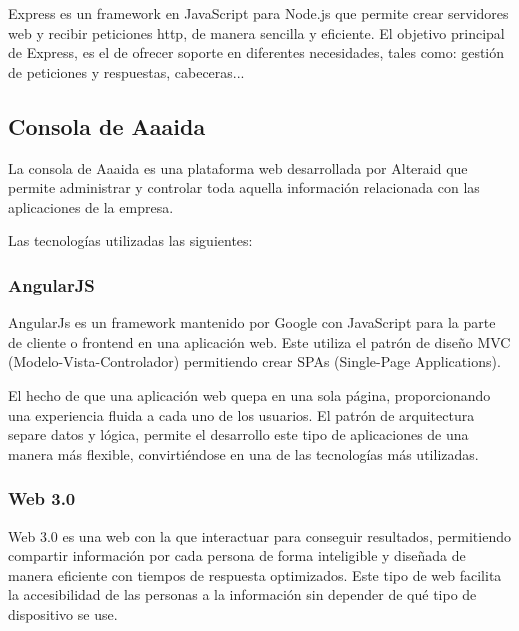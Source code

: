Express es un framework en JavaScript para Node.js que permite crear
servidores web y recibir peticiones http, de manera sencilla y eficiente.
El objetivo principal de Express, es el de ofrecer soporte en diferentes
necesidades, tales como: gestión de peticiones y respuestas, cabeceras...

\subsection{Consola de Aaaida}

La consola de Aaaida es una plataforma web desarrollada por Alteraid que permite administrar y controlar toda aquella información relacionada con las aplicaciones de la empresa.

Las tecnologías utilizadas las siguientes:

\subsubsection{AngularJS}

AngularJs es un framework mantenido por Google con JavaScript para la parte de cliente o frontend en una aplicación web. Este utiliza el patrón de diseño MVC (Modelo-Vista-Controlador) permitiendo crear SPAs (Single-Page Applications).

El hecho de que una aplicación web quepa en una sola página, proporcionando una experiencia fluida a cada uno de los usuarios. El patrón de arquitectura separe datos y lógica, permite el desarrollo este tipo de aplicaciones de una manera más flexible, convirtiéndose en una de las tecnologías más
utilizadas.

\subsubsection{Web 3.0}

Web 3.0 es una web con la que interactuar para conseguir resultados, permitiendo compartir información por cada persona de forma inteligible y diseñada de manera eficiente con tiempos de respuesta optimizados. Este tipo de web facilita la accesibilidad de las personas a la información sin depender de qué tipo de dispositivo se use.